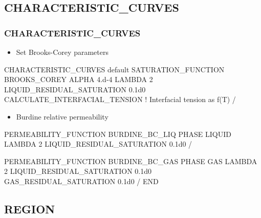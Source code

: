 \documentclass{beamer}
\newcommand\bluecomment[1]{{{\color{blue} #1}}}
\begin{document}
\subsection{CHARACTERISTIC\_CURVES}

\begin{frame}\frametitle{CHARACTERISTIC\_CURVES}

\begin{itemize}
\item Set Brooks-Corey parameters
\end{itemize}

\begin{semiverbatim}
CHARACTERISTIC_CURVES default
  SATURATION_FUNCTION BROOKS_COREY
    ALPHA 4.d-4
    LAMBDA 2
    LIQUID_RESIDUAL_SATURATION 0.1d0
    CALCULATE_INTERFACIAL_TENSION 
     \bluecomment{        ! Interfacial tension as f(T)}
  /
\end{semiverbatim}

\newpage
\begin{itemize}
\item Burdine relative permeability
\end{itemize}

\begin{semiverbatim}
  PERMEABILITY_FUNCTION BURDINE_BC_LIQ
    PHASE LIQUID
    LAMBDA 2
    LIQUID_RESIDUAL_SATURATION 0.1d0
  /

  PERMEABILITY_FUNCTION BURDINE_BC_GAS
    PHASE GAS
    LAMBDA 2
    LIQUID_RESIDUAL_SATURATION 0.1d0
    GAS_RESIDUAL_SATURATION 0.1d0
  /
END
\end{semiverbatim}

\end{frame}

\subsection{REGION}
\end{document}
